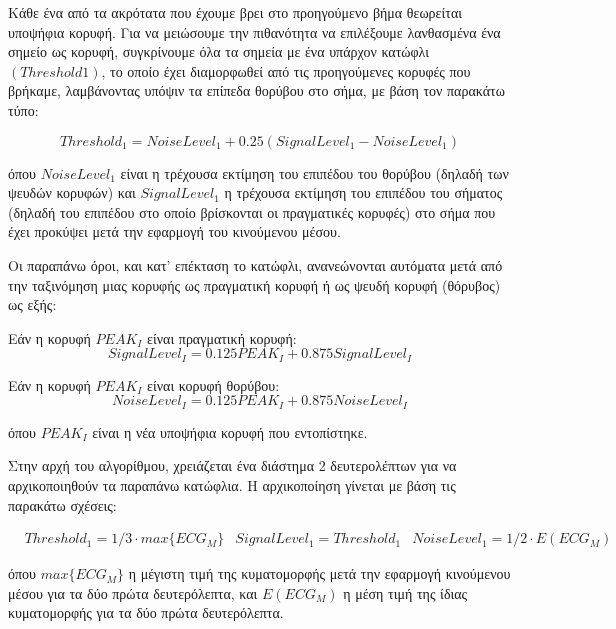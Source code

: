 Κάθε ένα από τα ακρότατα που έχουμε βρει στο προηγούμενο βήμα θεωρείται υποψήφια κορυφή. Για να μειώσουμε την πιθανότητα να επιλέξουμε λανθασμένα ένα σημείο ως κορυφή, συγκρίνουμε όλα τα σημεία με ένα υπάρχον κατώφλι $(Threshold1)$, το οποίο έχει διαμορφωθεί από τις προηγούμενες κορυφές που βρήκαμε, λαμβάνοντας υπόψιν τα επίπεδα θορύβου στο σήμα, με βάση τον παρακάτω τύπο:

\begin{equation}
\label{eq:threshold1}
   Threshold_1 = NoiseLevel_1 + 0.25(SignalLevel_1 - NoiseLevel_1)
\end{equation}

όπου $NoiseLevel_1$ είναι η τρέχουσα εκτίμηση του επιπέδου του θορύβου (δηλαδή των ψευδών κορυφών) και $SignalLevel_1$ η τρέχουσα εκτίμηση του επιπέδου του σήματος (δηλαδή του επιπέδου στο οποίο βρίσκονται οι πραγματικές κορυφές) στο σήμα που έχει προκύψει μετά την εφαρμογή του κινούμενου μέσου.

Οι παραπάνω όροι, και κατ' επέκταση το κατώφλι, ανανεώνονται αυτόματα μετά από την ταξινόμηση μιας κορυφής ως πραγματική κορυφή ή ως ψευδή κορυφή (θόρυβος) ως εξής:

Εάν η κορυφή $PEAK_I$ είναι πραγματική κορυφή:
\begin{equation}
\label{eq:threshold1_renewal}
   SignalLevel_I = 0.125PEAK_I + 0.875SignalLevel_I 
\end{equation}

Εάν η κορυφή $PEAK_I$ είναι κορυφή θορύβου:
\begin{equation}
\label{eq:threshold1_renewal}
   NoiseLevel_I = 0.125PEAK_I + 0.875NoiseLevel_I 
\end{equation}

όπου $PEAK_I$ είναι η νέα υποψήφια κορυφή που εντοπίστηκε.

Στην αρχή του αλγορίθμου, χρειάζεται ένα διάστημα 2 δευτερολέπτων για να αρχικοποιηθούν τα παραπάνω κατώφλια. Η αρχικοποίηση γίνεται με βάση τις παρακάτω σχέσεις:

\begin{equation}
\label{eq:threshold1_starting_conditions}
\begin{array}{l}
    & Threshold_1 = 1/3\cdot max\{ECG_M\}
    & SignalLevel_1 = Threshold_1
    & NoiseLevel_1 = 1/2 \cdot E(ECG_M)
\end{array}
\end{equation}

όπου $max\{ECG_M\}$ η μέγιστη τιμή της κυματομορφής μετά την εφαρμογή κινούμενου μέσου για τα δύο πρώτα δευτερόλεπτα, και $E(ECG_M)$ η μέση τιμή της ίδιας κυματομορφής για τα δύο πρώτα δευτερόλεπτα.

